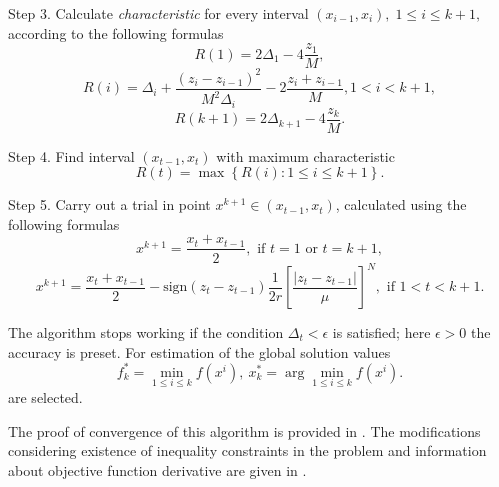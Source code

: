 \documentclass[smallcondensed]{svjour3}     %
\begin{document}
Step 3. Calculate \textit{characteristic} for every interval $(x_{i-1}, x_i), \; 1\leq i \leq k+1,$   according to the following formulas
\[
R(1)=2\Delta_1-4\frac{z_1}{M},
\]
\begin{equation}\label{eq:14}
R(i)=\Delta_i+\frac{(z_i-z_{i-1})^2}{M^2\Delta_i}-2\frac{z_i+z_{i-1}}{M},1<i<k+1,
\end{equation}
\[
R(k+1)=2\Delta_{k+1}-4\frac{z_k}{M}.
\]

Step 4. Find interval $(x_{t-1},x_t)$ with maximum characteristic
\[
R(t)=\max{\left\{R(i): 1 \leq i \leq k+1\right\}}.
\]

Step 5. Carry out a trial in point $x^{k+1}\in(x_{t-1},x_t)$, calculated using the following formulas
\[
x^{k+1} = \frac{x_t+x_{t-1}}{2}, \textrm{ if } t=1 \textrm{ or } t=k+1,
\]
\[
x^{k+1} = \frac{x_t+x_{t-1}}{2} - \mathrm{sign}(z_t-z_{t-1})\frac{1}{2r}\left[\frac{\left|z_t-z_{t-1}\right|}{\mu}\right]^N, \textrm{ if } 1<t<k+1.
\]

The algorithm stops working if the condition $\Delta_t<\epsilon$ is satisfied; here $\epsilon>0$ the accuracy is preset. For estimation of the global solution values
\[
f_k^\ast=\min_{1\leq i \leq k}f(x^i), \ x_k^\ast=\arg \min_{1\leq i \leq k}f(x^i).
\]
are selected.

The proof of convergence of this algorithm is provided in \cite{RefStrongin2000}. The modifications considering existence of inequality constraints in the problem and information about objective function derivative are given in \cite{RefBarkalov,RefGergel1996,RefGergel1997}.
\end{document}
